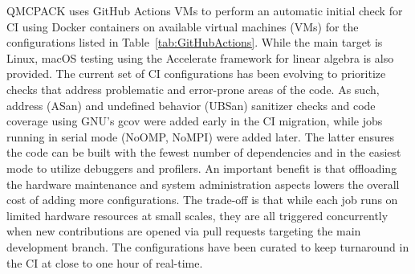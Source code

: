 QMCPACK uses GitHub Actions VMs to perform an automatic initial check for CI using Docker containers on available virtual machines (VMs) for the configurations listed in Table~\ref{tab:GitHubActions}.
While the main target is Linux, macOS testing using the Accelerate framework for linear algebra is also provided.
The current set of CI configurations has been evolving to prioritize checks that address problematic and error-prone areas of the code.
As such, address (ASan) and undefined behavior (UBSan) sanitizer checks and code coverage using GNU's gcov were added early in the CI migration, while jobs running in serial mode (NoOMP, NoMPI) were added later. 
The latter ensures the code can be built with the fewest number of dependencies and in the easiest mode to utilize debuggers and profilers.
An important benefit is that offloading the hardware maintenance and system administration aspects lowers the overall cost of adding more configurations.
The trade-off is that while each job runs on limited hardware resources at small scales, they are all triggered concurrently when new contributions are opened via pull requests targeting the main development branch. The configurations have been curated to keep turnaround in the CI at close to one hour of real-time.
 
